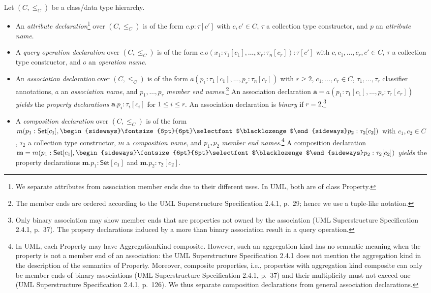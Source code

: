 \documentclass[10pt,fleqn,%
\ifpretendfinal
final%
\else
draft%
\fi,
]{scrreprt}
\newcommand{\uml}[1]{\textsf{#1}}
\newcommand{\composition}{\raisebox{0.2pt}{\begin{sideways}\fontsize{6pt}{6pt}\selectfont$\blacklozenge$\end{sideways}}}
\begin{document}
\medskip
Let $(C, {\leq_C})$ be a class/data type hierarchy.
%
\begin{itemize}[label={--}, leftmargin=*]
  \item An \emph{attribute declaration}\footnote{We separate attributes
  from association member ends due to their different uses.  In UML,
  both are of class \uml{Property}.} over $(C, {\leq_C})$ is of the form
$c.p : \tau[c']$ with $c, c' \in C$, $\tau$ a collection type
constructor, and $p$ an \emph{attribute name}.

  \item A \emph{query operation declaration} over $(C, {\leq_C})$ is of the
form $c.o(x_1 : \tau_1[c_1], \dots, x_r : \tau_n[c_r]) : \tau[c']$ with $c, c_1,\ldots, c_r, c' \in C$, $\tau$ a collection type
constructor, and $o$ an \emph{operation name}.

  \item An \emph{association declaration} over $(C, {\leq_C})$ is of the
form $a(p_1 : \tau_1[c_1], \dots, p_r : \tau_n[c_r])$ with $r \geq 2$,
$c_1, \dots, c_r \in C$, $\tau_1, \ldots, \tau_r$ classifier
annotations, $a$ an \emph{association name}, and $p_1, \dots, p_r$
\emph{member end names}.\footnote{The member ends are ordered according
  to the UML Superstructure Specification 2.4.1, p.~29; hence we use a
  tuple-like notation.}  An association declaration
$\mathbf{a} = a(p_1 : \tau_1[c_1], \ldots, p_r : \tau_r[c_r])$
\emph{yields} the \emph{property declarations}
$\mathbf{a}.p_i : \tau_i[c_i]$ for $1 \leq i \leq r$.  An association
declaration is \emph{binary} if $r = 2$.\footnote{Only binary
  association may show member ends that are properties not owned by the
  association (UML Superstructure Specification 2.4.1, p.~37).  The
  propery declarations induced by a more than binary association result
  in a query operation.}

  \item A \emph{composition declaration} over $(C, {\leq_C})$ is of the
form $m(p_1 : \mathsf{Set}[c_1], \composition p_2 : \tau_2[c_2])$ with
$c_1, c_2 \in C$, $\tau_2$ a collection type constructor, $m$ a
\emph{composition name}, and $p_1, p_2$ \emph{member end
  names}.\footnote{In UML, each \uml{Property} may have
  \uml{AggregationKind} \uml{composite}.  However, such an aggregation
  kind has no semantic meaning when the property is not a member end
  of an association: the UML Superstructure Specification 2.4.1 does not
  mention the aggregation kind in the description of the semantics of
  \uml{Property}.  Moreover, composite properties, i.e., properties with
  aggregation kind \uml{composite} can only be member ends of binary
  associations (UML Superstructure Specification 2.4.1, p.~37) and their
  multiplicity must not exceed one (UML Superstructure Specification
  2.4.1, p.~126).  We thus separate composition declarations from
  general association declarations.}  A composition declaration
$\mathbf{m} = m(p_1 : \mathsf{Set}[c_1], \composition p_2 :
\tau_2[c_2])$
\emph{yields} the property declarations
$\mathbf{m}.p_1 : \mathsf{Set}[c_1]$ and $\mathbf{m}.p_2 : \tau_2[c_2]$.
\end{itemize}
\end{document}
